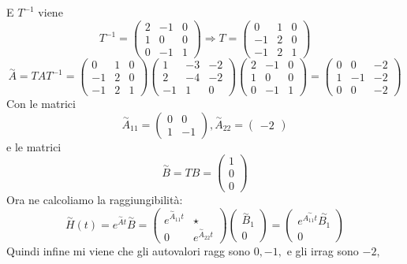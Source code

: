 \documentclass{article}
\begin{document}
E $T^{-1}$ viene \[ T^{-1} = \left(\begin{matrix}2 & -1 & 0\\1 & 0 & 0\\0 & -1 & 1\end{matrix}\right) \Longrightarrow T = \left(\begin{matrix}0 & 1 & 0\\-1 & 2 & 0\\-1 & 2 & 1\end{matrix}\right) \]
\[ \overset{\sim}{A} = T A  T^{-1} = \left(\begin{matrix}0 & 1 & 0\\-1 & 2 & 0\\-1 & 2 & 1\end{matrix}\right)\left(\begin{matrix}1 & -3 & -2\\2 & -4 & -2\\-1 & 1 & 0\end{matrix}\right)\left(\begin{matrix}2 & -1 & 0\\1 & 0 & 0\\0 & -1 & 1\end{matrix}\right) = \left(\begin{matrix}0 & 0 & -2\\1 & -1 & -2\\0 & 0 & -2\end{matrix}\right) \]Con le matrici \[ \overset{\sim}{A}_{11} = \left(\begin{matrix}0 & 0\\1 & -1\end{matrix}\right) , \overset{\sim}{A}_{22} = \left(\begin{matrix}-2\end{matrix}\right)  \]e le matrici \[ \overset{\sim}{B} = TB = \left(\begin{matrix}1\\0\\0\end{matrix}\right)  \]
Ora ne calcoliamo la raggiungibilità: \[ \overset{\sim}{H}(t) = e^{\overset{\sim}{A}t}\overset{\sim}{B} = \begin{pmatrix} e^{\overset{\sim}{A}_{11}t} &  \star \\ 0 & e^{\overset{\sim}{A}_{22}t} \end{pmatrix} \begin{pmatrix} \overset{\sim}{B}_1 \\ 0 \end{pmatrix} = \begin{pmatrix} e^{\overset{\sim}{A_{11}t}}\overset{\sim}{B_1} \\ 0 \end{pmatrix} \]
Quindi infine mi viene che gli autovalori ragg sono $ 0, -1,  $ e gli irrag sono $ -2,  $
\end{document}
